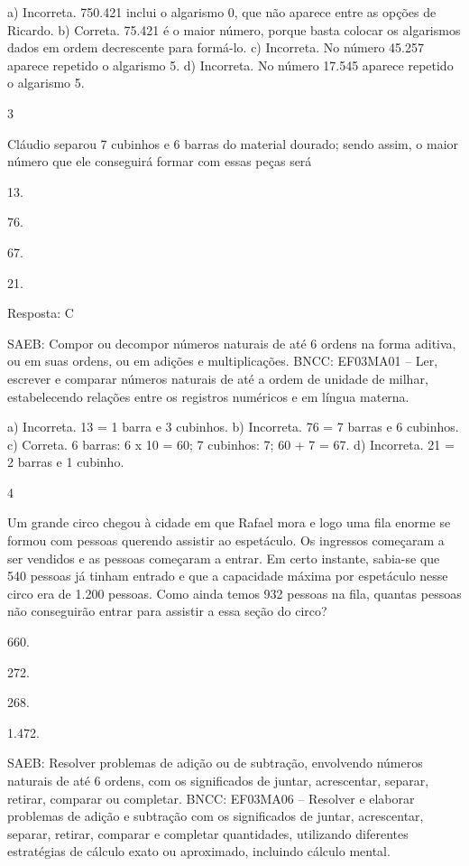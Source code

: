 {\begin{escolha}
{a) Incorreta. 750.421 inclui o algarismo 0, que não aparece entre as opções de Ricardo.
b) Correta. 75.421 é o maior número, porque basta colocar os algarismos dados em ordem decrescente para formá-lo.
c) Incorreta. No número 45.257 aparece repetido o algarismo 5. 
d) Incorreta. No número 17.545 aparece repetido o algarismo 5. 

\num{3}

Cláudio separou 7 cubinhos e 6 barras do material dourado; sendo assim, o maior número que ele conseguirá formar com essas peças será

\begin{escolha}
\item
  13.
\item
  76.
\item
  67.
\item
  21.
\end{escolha}

Resposta: C



SAEB: Compor ou decompor números naturais de até 6 ordens na forma aditiva, ou em suas ordens, ou em adições e multiplicações.
BNCC: EF03MA01 -- Ler, escrever e comparar números naturais de até a ordem de unidade de milhar, estabelecendo relações entre os registros numéricos e em língua materna.

a) Incorreta. 13 = 1 barra e 3 cubinhos.
b) Incorreta. 76 = 7 barras e 6 cubinhos.
c) Correta. 6 barras: 6 x 10 = 60; 7 cubinhos: 7; 60 + 7 = 67.
d) Incorreta. 21 = 2 barras e 1 cubinho.

\num{4}

Um grande circo chegou à cidade em que Rafael mora e logo uma fila enorme se formou com pessoas querendo assistir ao espetáculo. Os ingressos começaram a ser vendidos e as pessoas começaram a entrar. Em certo instante, sabia-se que 540 pessoas já tinham entrado e que a capacidade máxima por espetáculo nesse circo era de 1.200 pessoas. Como ainda temos 932 pessoas na fila, quantas pessoas não conseguirão entrar para assistir a essa seção do circo?

\begin{escolha}
\item
  660.
\item
  272.
\item
  268.
\item
  1.472.
\end{escolha}

SAEB: Resolver problemas de adição ou de subtração,
envolvendo números naturais de até 6 ordens, com os significados de
juntar, acrescentar, separar, retirar, comparar ou completar.
BNCC: EF03MA06 – Resolver e elaborar problemas de adição e subtração com os significados de
juntar, acrescentar, separar, retirar, comparar e completar quantidades, utilizando diferentes
estratégias de cálculo exato ou aproximado, incluindo cálculo mental.


}
\end{escolha}}
